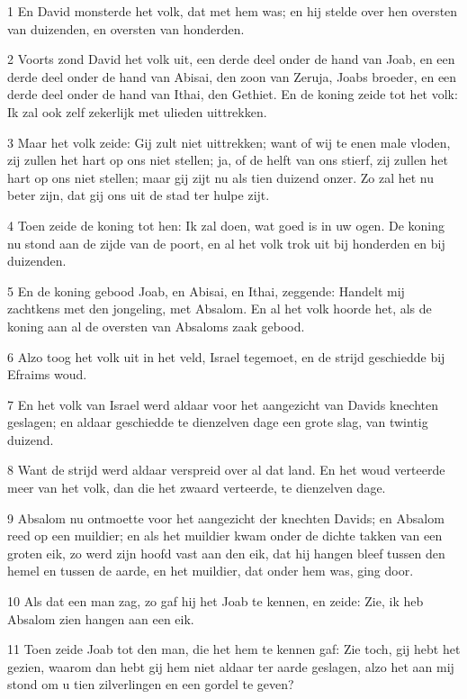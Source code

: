 \par 1 En David monsterde het volk, dat met hem was; en hij stelde over hen oversten van duizenden, en oversten van honderden.
\par 2 Voorts zond David het volk uit, een derde deel onder de hand van Joab, en een derde deel onder de hand van Abisai, den zoon van Zeruja, Joabs broeder, en een derde deel onder de hand van Ithai, den Gethiet. En de koning zeide tot het volk: Ik zal ook zelf zekerlijk met ulieden uittrekken.
\par 3 Maar het volk zeide: Gij zult niet uittrekken; want of wij te enen male vloden, zij zullen het hart op ons niet stellen; ja, of de helft van ons stierf, zij zullen het hart op ons niet stellen; maar gij zijt nu als tien duizend onzer. Zo zal het nu beter zijn, dat gij ons uit de stad ter hulpe zijt.
\par 4 Toen zeide de koning tot hen: Ik zal doen, wat goed is in uw ogen. De koning nu stond aan de zijde van de poort, en al het volk trok uit bij honderden en bij duizenden.
\par 5 En de koning gebood Joab, en Abisai, en Ithai, zeggende: Handelt mij zachtkens met den jongeling, met Absalom. En al het volk hoorde het, als de koning aan al de oversten van Absaloms zaak gebood.
\par 6 Alzo toog het volk uit in het veld, Israel tegemoet, en de strijd geschiedde bij Efraims woud.
\par 7 En het volk van Israel werd aldaar voor het aangezicht van Davids knechten geslagen; en aldaar geschiedde te dienzelven dage een grote slag, van twintig duizend.
\par 8 Want de strijd werd aldaar verspreid over al dat land. En het woud verteerde meer van het volk, dan die het zwaard verteerde, te dienzelven dage.
\par 9 Absalom nu ontmoette voor het aangezicht der knechten Davids; en Absalom reed op een muildier; en als het muildier kwam onder de dichte takken van een groten eik, zo werd zijn hoofd vast aan den eik, dat hij hangen bleef tussen den hemel en tussen de aarde, en het muildier, dat onder hem was, ging door.
\par 10 Als dat een man zag, zo gaf hij het Joab te kennen, en zeide: Zie, ik heb Absalom zien hangen aan een eik.
\par 11 Toen zeide Joab tot den man, die het hem te kennen gaf: Zie toch, gij hebt het gezien, waarom dan hebt gij hem niet aldaar ter aarde geslagen, alzo het aan mij stond om u tien zilverlingen en een gordel te geven?
